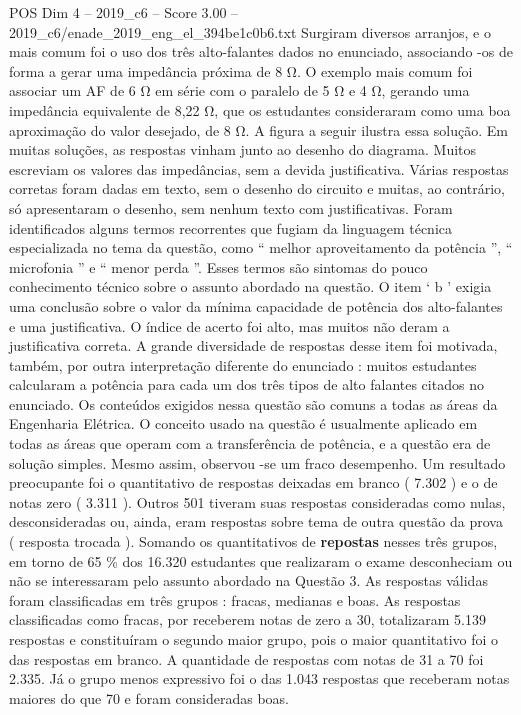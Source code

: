 \begin{textsample}{POS Dim 4 – 2019\_c6 – Score 3.00 – 2019\_c6/enade\_2019\_eng\_el\_394be1c0b6.txt}
Surgiram diversos arranjos, e o mais comum foi o uso dos três alto-falantes dados no enunciado, associando -os de forma a gerar uma impedância próxima de 8 Ω.
O exemplo mais comum foi associar um AF de 6 Ω em série com o paralelo de 5 Ω e 4 Ω, gerando uma impedância equivalente de 8,22 Ω, que os estudantes consideraram como uma boa aproximação do valor desejado, de 8 Ω.
A figura a seguir ilustra essa solução.
Em muitas soluções, as respostas vinham junto ao desenho do diagrama.
Muitos escreviam os valores das impedâncias, sem a devida justificativa.
Várias respostas corretas foram dadas em texto, sem o desenho do circuito e muitas, ao contrário, só apresentaram o desenho, sem nenhum texto com justificativas.
Foram identificados alguns termos recorrentes que fugiam da linguagem técnica especializada no tema da questão, como “ melhor aproveitamento da potência ”, “ microfonia ” e “ menor perda ”.
Esses termos são sintomas do pouco conhecimento técnico sobre o assunto abordado na questão.
O item ‘ b ’ exigia uma conclusão sobre o valor da mínima capacidade de potência dos alto-falantes e uma justificativa.
O índice de acerto foi alto, mas muitos não deram a justificativa correta.
A grande diversidade de respostas desse item foi motivada, também, por outra interpretação diferente do enunciado : muitos estudantes calcularam a potência para cada um dos três tipos de alto falantes citados no enunciado.
Os conteúdos exigidos nessa questão são comuns a todas as áreas da Engenharia Elétrica.
O conceito usado na questão é usualmente aplicado em todas as áreas que operam com a transferência de potência, e a questão era de solução simples.
Mesmo assim, observou -se um fraco desempenho.
Um resultado preocupante foi o quantitativo de respostas deixadas em branco ( 7.302 ) e o de notas zero ( 3.311 ).
Outros 501 tiveram suas respostas consideradas como nulas, desconsideradas ou, ainda, eram respostas sobre tema de outra questão da prova ( resposta trocada ).
Somando os quantitativos de \textbf{repostas} nesses três grupos, em torno de 65 \% dos 16.320 estudantes que realizaram o exame desconheciam ou não se interessaram pelo assunto abordado na Questão 3.
As respostas válidas foram classificadas em três grupos : fracas, medianas e boas.
As respostas classificadas como fracas, por receberem notas de zero a 30, totalizaram 5.139 respostas e constituíram o segundo maior grupo, pois o maior quantitativo foi o das respostas em branco.
A quantidade de respostas com notas de 31 a 70 foi 2.335.
Já o grupo menos expressivo foi o das 1.043 respostas que receberam notas maiores do que 70 e foram consideradas boas.

\end{textsample}
